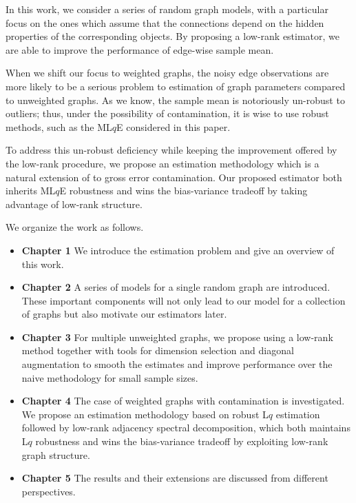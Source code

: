In this work, we consider a series of random graph models, with a particular focus on the ones which assume that the connections depend on the hidden properties of the corresponding objects. By proposing a low-rank estimator, we are able to improve the performance of edge-wise sample mean.

When we shift our focus to weighted graphs, the noisy edge observations are more likely to be a serious problem to estimation of graph parameters compared to unweighted graphs. As we know, the sample mean is notoriously un-robust to outliers;
thus, under the possibility of contamination, it is wise to use robust methods, such as the ML$q$E \citep{ferrari2010maximum, qin2013maximum} considered in this paper.

To address this un-robust deficiency while keeping the improvement offered by the low-rank procedure, we propose an estimation methodology which is a natural extension of \citep{tang2016law} to gross error contamination. Our proposed estimator both inherits ML$q$E robustness and wins the bias-variance tradeoff by taking advantage of low-rank structure.

We organize the work as follows.
\begin{itemize}
\item {\bf{Chapter 1}} We introduce the estimation problem and give an overview of this work.
\item {\bf{Chapter 2}} A series of models for a single random graph are introduced. These important components will not only lead to our model for a collection of graphs but also motivate our estimators later.
\item {\bf{Chapter 3}} For multiple unweighted graphs, we propose using a low-rank method together with tools for dimension selection and diagonal augmentation to smooth the estimates and improve performance over the naive methodology for small sample sizes.
\item {\bf{Chapter 4}} The case of weighted graphs with contamination is investigated. We propose an estimation methodology based on robust L$q$ estimation followed by low-rank adjacency spectral decomposition, which both maintains L$q$ robustness and wins the bias-variance tradeoff by exploiting low-rank graph structure.
\item {\bf{Chapter 5}} The results and their extensions are discussed from different perspectives.
\end{itemize}

